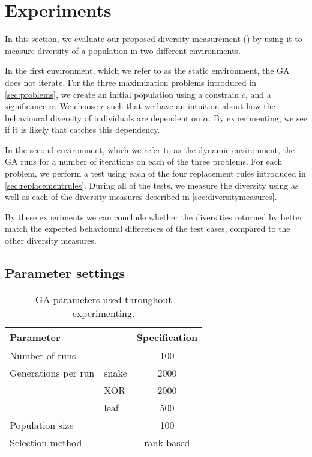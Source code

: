 \section{Experiments}\label{sec:experiments}
In this section, we evaluate our proposed diversity measurement (\dia) by using it to measure diversity of a population in two different environments.

In the first environment, which we refer to as the static environment, the GA does not iterate.
For the three maximization problems introduced in \cref{sec:problems}, we create an initial population using a constrain $c$, and a significance $\alpha$. We choose $c$ such that we have an intuition about how the behavioural diversity of individuals are dependent on $\alpha$. By experimenting, we see if it is likely that \dia{} catches this dependency.

In the second environment, which we refer to as the dynamic environment, the GA runs for a number of iterations on each of the three problems. 
For each problem, we perform a test using each of the four replacement rules introduced in \cref{sec:replacementrules}.
During all of the tests, we measure the diversity using \dia{} as well as each of the diversity measures described in \cref{sec:diversitymeasures}.

By these experiments we can conclude whether the diversities returned by \dia{} better match the expected behavioural differences of the test cases, compared to the other diversity measures.

\subsection{Parameter settings}

\begin{table}
  \centering
  \begin{tabular}{l l S}
    \toprule
    Parameter & & {Specification} \\
    \midrule
    Number of runs & & 100 \\
    Generations per run & snake & 2000 \\
    & XOR & 2000 \\
    & leaf & 500 \\
    Population size & & 100 \\
    Selection method & & {rank-based} \\
    \bottomrule
  \end{tabular}
  \caption{GA parameters used throughout experimenting.}
  \label{tab:gaparam}
\end{table}

